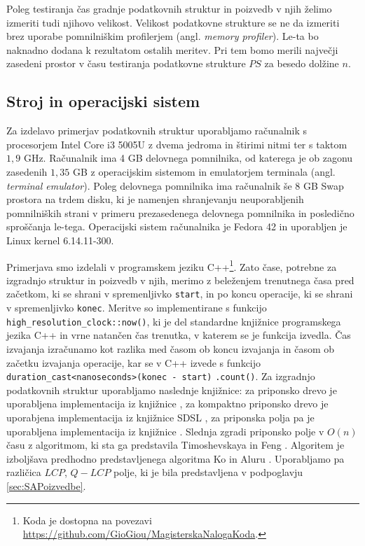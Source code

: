 Poleg testiranja čas gradnje podatkovnih struktur in poizvedb v njih želimo izmeriti tudi njihovo velikost. Velikost podatkovne strukture se ne da izmeriti brez uporabe pomnilniškim profilerjem (angl. \textit{memory profiler}). Le-ta bo naknadno dodana k rezultatom ostalih meritev. Pri tem bomo merili največji zasedeni prostor v času testiranja podatkovne strukture $PS$ za besedo dolžine $n$.

\subsection{Stroj in operacijski sistem}
Za izdelavo primerjav podatkovnih struktur uporabljamo računalnik s procesorjem Intel Core i3 5005U z dvema jedroma in štirimi nitmi ter s taktom $1,9$ GHz. Računalnik ima 4 GB delovnega pomnilnika, od katerega je ob zagonu zasedenih $1,35$ GB z operacijskim sistemom in emulatorjem terminala (angl. \textit{terminal emulator}). Poleg delovnega pomnilnika ima računalnik še $8$ GB Swap prostora na trdem disku, ki je namenjen shranjevanju neuporabljenih pomnilniških strani v primeru prezasedenega delovnega pomnilnika in posledično sproščanja le-tega. Operacijski sistem računalnika je Fedora 42 in uporabljen je Linux kernel 6.14.11-300.

Primerjava smo izdelali v programskem jeziku C++\footnote{Koda je dostopna na povezavi \url{https://github.com/GioGiou/MagisterskaNalogaKoda}.}. Zato čase, potrebne za izgradnjo struktur in poizvedb v njih, merimo z beleženjem trenutnega časa pred začetkom, ki se shrani v spremenljivko \verb|start|, in po koncu operacije, ki se shrani v spremenljivko \verb|konec|. Meritve so implementirane s funkcijo \verb|high_resolution_clock::now()|, ki je del standardne knjižnice programskega jezika C++ in vrne natančen čas trenutka, v katerem se je funkcija izvedla. Čas izvajanja izračunamo kot razlika med časom ob koncu izvajanja in časom ob začetku izvajanja operacije, kar se v C++ izvede s funkcijo \verb|duration_cast<nanoseconds>(konec - start)| \verb|.count()|. Za izgradnjo podatkovnih struktur uporabljamo naslednje knjižnice: za priponsko drevo je uporabljena implementacija iz knjižnice \cite{ganeshk13}, za  kompaktno priponsko drevo je uporabjena implementacija iz knjižnice SDSL \cite{gbmp2014sea}, za priponska polja pa je uporabljena implementacija iz knjižnice \cite{Grebnov2025}. Slednja zgradi priponsko polje v $O(n)$ času z algoritmom, ki sta ga predstavila Timoshevskaya in Feng \cite{Timoshevskaya2014}. Algoritem je izboljšava predhodno predstavljenega algoritma Ko in Aluru \cite{Ko2005}. Uporabljamo pa različica $LCP$, $Q-LCP$ polje, ki je bila predstavljena v podpoglavju \ref{sec:SAPoizvedbe}.

